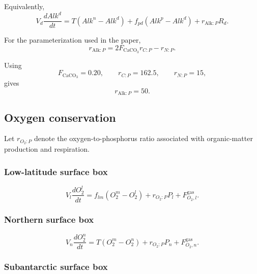 \documentclass[11pt]{article}
\begin{document}
Equivalently,
\begin{equation}
V_d\frac{dAlk^d}{dt}
=
T\left(Alk^n-Alk^d\right)
+
f_{pd}\left(Alk^p-Alk^d\right)
+
r_{\mathrm{Alk}:P}R_d.
\label{eq:six_alk_d_compact}
\end{equation}

For the parameterization used in the paper,
\begin{equation}
r_{\mathrm{Alk}:P}
=
2F_{\mathrm{CaCO_3}}r_{C:P}
-
r_{N:P}.
\label{eq:six_alk_ratio}
\end{equation}

Using
\[
F_{\mathrm{CaCO_3}}=0.20,
\qquad
r_{C:P}=162.5,
\qquad
r_{N:P}=15,
\]
gives
\begin{equation}
r_{\mathrm{Alk}:P}=50.
\label{eq:six_alk_ratio_value}
\end{equation}

\subsection{Oxygen conservation}

Let \(r_{O_2:P}\) denote the oxygen-to-phosphorus ratio
associated with organic-matter production and respiration.

\subsubsection{Low-latitude surface box}

\begin{equation}
V_l\frac{dO_2^l}{dt}
=
f_{lm}\left(O_2^m-O_2^l\right)
+
r_{O_2:P}P_l
+
F^{\mathrm{gas}}_{O_2,l}.
\label{eq:six_o2_l}
\end{equation}

\subsubsection{Northern surface box}

\begin{equation}
V_n\frac{dO_2^n}{dt}
=
T\left(O_2^m-O_2^n\right)
+
r_{O_2:P}P_n
+
F^{\mathrm{gas}}_{O_2,n}.
\label{eq:six_o2_n}
\end{equation}

\subsubsection{Subantarctic surface box}
\end{document}
